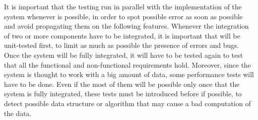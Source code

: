 \documentclass[../RASD.tex]{subfiles}
\begin{document}
    It is important that the testing run in parallel with the implementation of the system whenever is possible, in order to spot possible error as soon as possible and avoid propagating them on the following features.
    Whenever the integration of two or more components have to be integrated, it is important that will be unit-tested first, to limit as much as possible the presence of errors and bugs.
    Once the system will be fully integrated, it will have to be tested again to test that all the functional and non-functional requirements hold.
    Moreover, since the system is thought to work with a big amount of data, some performance tests will have to be done. Even if the most of them will be possible only once that the system is fully integrated, these tests must be introduced before if possible, to detect possible data structure or algorithm that may cause a bad computation of the data.
\end{document}
